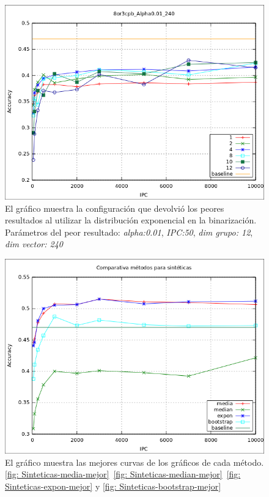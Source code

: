 			\begin{figure}[htbp]
				\centering
				\includegraphics[scale=0.6]{img/resultados/sinteticas/worst_expon_8or3cpb_Alpha0,01_240.png}
				\caption[Sintéticas exponencial peor resultado]{El gráfico muestra la configuración que devolvió los peores resultados al utilizar la distribución exponencial en la binarización. Parámetros del peor resultado: \textit{alpha:0.01}, \textit{IPC:50}, \textit{dim grupo: 12}, \textit{dim vector: 240}}
				\label{fig: Sinteticas-expon-peor}
			\end{figure}
			
			
			\begin{figure}[htbp]
				\centering
				\includegraphics[scale=0.6]{img/resultados/sinteticas/comparativa_metodos.png}
				\caption[Sintéticas comparativa métodos]{El gráfico muestra las mejores curvas de los gráficos de cada método. \ref{fig: Sinteticas-media-mejor}~\ref{fig: Sinteticas-median-mejor}~\ref{fig: Sinteticas-expon-mejor} y \ref{fig: Sinteticas-bootstrap-mejor}}
				\label{fig: Sinteticas-comparativa metodos}
			\end{figure}

